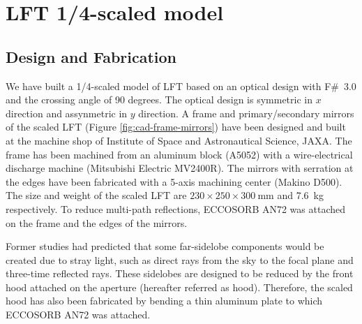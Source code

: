 \documentclass[journal]{IEEEtran}
\begin{document}
\section{LFT 1/4-scaled model}
%
\subsection{Design and Fabrication}
%
\par
We have built a 1/4-scaled model of LFT based on an optical design with F\#~3.0 and the crossing angle of 90 degrees. The optical design is symmetric in $x$ direction and assynmetric in $y$ direction. 
A frame and primary/secondary mirrors of the scaled LFT (Figure \ref{fig:cad-frame-mirrors}) have been designed and built at the machine shop of Institute of Space and Astronautical Science, JAXA.
The frame has been machined from an aluminum block (A5052) with a wire-electrical discharge machine (Mitsubishi Electric MV2400R).
The mirrors with serration at the edges have been fabricated with a 5-axis machining center (Makino D500).
The size and weight of the scaled LFT are $230 \times 250 \times 300 ~\mathrm{mm}$ and 7.6~kg respectively. To reduce multi-path reflections, ECCOSORB AN72 was attached on the frame and the edges of the mirrors.
%
\par
Former studies \cite{Kashima2018, Imada2018} had predicted that some far-sidelobe components would be created due to stray light, such as direct rays from the sky to the focal plane and three-time reflected rays. These sidelobes are designed to be reduced by the front hood attached on the aperture (hereafter referred as hood). Therefore, the scaled hood has also been fabricated by bending a thin aluminum plate to which ECCOSORB AN72 was attached.
%
\end{document}
